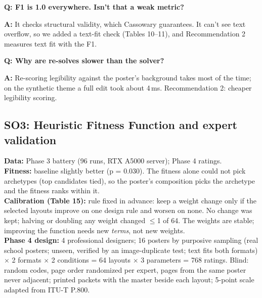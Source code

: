 \documentclass[10pt,a4paper]{article}
\newcommand{\Q}[1]{\par\smallskip\textbf{\color{navy}Q: #1}\par}
\newcommand{\A}{\textbf{A:} }
\begin{document}
\Q{F1 is 1.0 everywhere. Isn't that a weak metric?}
\A It checks structural validity, which Cassowary guarantees. It can't see text overflow, so we added a text-fit check (Tables 10--11), and Recommendation 2 measures text fit with the F1.
\Q{Why are re-solves slower than the solver?}
\A Re-scoring legibility against the poster's background takes most of the time; on the synthetic theme a full edit took about 4\,ms. Recommendation 2: cheaper legibility scoring.

\subsection{SO3: Heuristic Fitness Function and expert validation}
\textbf{Data:} Phase 3 battery (96 runs, RTX A5000 server); Phase 4 ratings.\\
\textbf{Fitness:} baseline slightly better (p = 0.030). The fitness alone could not pick archetypes (top candidates tied), so the poster's composition picks the archetype and the fitness ranks within it.\\
\textbf{Calibration (Table 15):} rule fixed in advance: keep a weight change only if the selected layouts improve on one design rule and worsen on none. No change was kept; halving or doubling any weight changed $\le$1 of 64. The weights are stable; improving the function needs new \emph{terms}, not new weights.\\
\textbf{Phase 4 design:} 4 professional designers; 16 posters by purposive sampling (real school posters; unseen, verified by an image-duplicate test; text fits both formats) $\times$ 2 formats $\times$ 2 conditions = 64 layouts $\times$ 3 parameters = 768 ratings. Blind: random codes, page order randomized per expert, pages from the same poster never adjacent; printed packets with the master beside each layout; 5-point scale adapted from ITU-T P.800.
\end{document}
